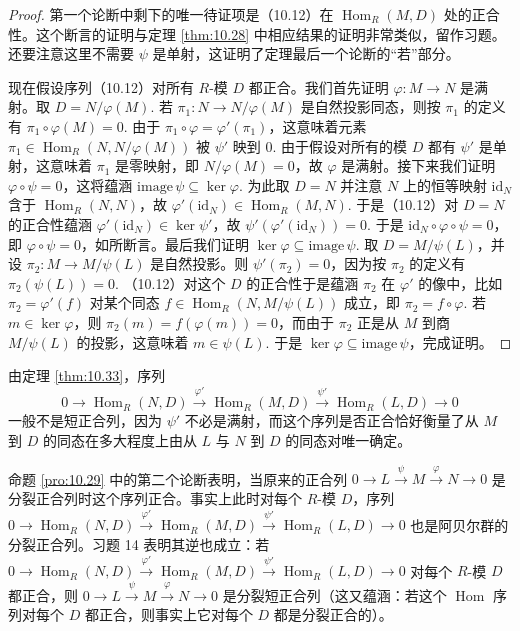 \begin{proof}
第一个论断中剩下的唯一待证项是（10.12）在 \(\operatorname{Hom}_R(M, D)\) 处的正合性。这个断言的证明与定理 \ref{thm:10.28} 中相应结果的证明非常类似，留作习题。还要注意这里不需要 \(\psi\) 是单射，这证明了定理最后一个论断的“若”部分。

现在假设序列（10.12）对所有 \(R\)-模 \(D\) 都正合。我们首先证明 \(\varphi : M \to N\) 是满射。取 \(D = N/\varphi(M)\). 若 \(\pi_1 : N \to N/\varphi(M)\) 是自然投影同态，则按 \(\pi_1\) 的定义有 \(\pi_1 \circ \varphi(M) = 0\). 由于 \(\pi_1 \circ \varphi = \varphi'(\pi_1)\)，这意味着元素 \(\pi_1 \in \operatorname{Hom}_R(N, N/\varphi(M))\) 被 \(\psi'\) 映到 0. 由于假设对所有的模 \(D\) 都有 \(\psi'\) 是单射，这意味着 \(\pi_1\) 是零映射，即 \(N/\varphi(M) = 0\)，故 \(\varphi\) 是满射。接下来我们证明 \(\varphi \circ \psi = 0\)，这将蕴涵 \(\mathrm{image}\,\psi \subseteq \ker\varphi\). 为此取 \(D = N\) 并注意 \(N\) 上的恒等映射 \(\mathrm{id}_N\) 含于 \(\operatorname{Hom}_R(N, N)\)，故 \(\varphi'(\mathrm{id}_N) \in \operatorname{Hom}_R(M, N)\). 于是（10.12）对 \(D = N\) 的正合性蕴涵 \(\varphi'(\mathrm{id}_N) \in \ker\psi'\)，故 \(\psi'(\varphi'(\mathrm{id}_N)) = 0\). 于是 \(\mathrm{id}_N \circ \varphi \circ \psi = 0\)，即 \(\varphi \circ \psi = 0\)，如所断言。最后我们证明 \(\ker\varphi \subseteq \mathrm{image}\,\psi\). 取 \(D = M/\psi(L)\)，并设 \(\pi_2 : M \to M/\psi(L)\) 是自然投影。则 \(\psi'(\pi_2) = 0\)，因为按 \(\pi_2\) 的定义有 \(\pi_2(\psi(L)) = 0\). （10.12）对这个 \(D\) 的正合性于是蕴涵 \(\pi_2\) 在 \(\varphi'\) 的像中，比如 \(\pi_2 = \varphi'(f)\) 对某个同态 \(f \in \operatorname{Hom}_R(N, M/\psi(L))\) 成立，即 \(\pi_2 = f \circ \varphi\). 若 \(m \in \ker\varphi\)，则 \(\pi_2(m) = f(\varphi(m)) = 0\)，而由于 \(\pi_2\) 正是从 \(M\) 到商 \(M/\psi(L)\) 的投影，这意味着 \(m \in \psi(L)\). 于是 \(\ker\varphi \subseteq \mathrm{image}\,\psi\)，完成证明。
\end{proof}

由定理 \ref{thm:10.33}，序列
\[
0 \longrightarrow \operatorname{Hom}_R(N, D) \xrightarrow{\ \varphi'\ } \operatorname{Hom}_R(M, D) \xrightarrow{\ \psi'\ } \operatorname{Hom}_R(L, D) \longrightarrow 0
\]
一般不是短正合列，因为 \(\psi'\) 不必是满射，而这个序列是否正合恰好衡量了从 \(M\) 到 \(D\) 的同态在多大程度上由从 \(L\) 与 \(N\) 到 \(D\) 的同态对唯一确定。

命题 \ref{pro:10.29} 中的第二个论断表明，当原来的正合列 \(0 \to L \xrightarrow{\psi} M \xrightarrow{\varphi} N \to 0\) 是分裂正合列时这个序列正合。事实上此时对每个 \(R\)-模 \(D\)，序列 \(0 \to \operatorname{Hom}_R(N, D) \xrightarrow{\varphi'} \operatorname{Hom}_R(M, D) \xrightarrow{\psi'} \operatorname{Hom}_R(L, D) \to 0\) 也是阿贝尔群的分裂正合列。习题 14 表明其逆也成立：若 \(0 \to \operatorname{Hom}_R(N, D) \xrightarrow{\varphi'} \operatorname{Hom}_R(M, D) \xrightarrow{\psi'} \operatorname{Hom}_R(L, D) \to 0\) 对每个 \(R\)-模 \(D\) 都正合，则 \(0 \to L \xrightarrow{\psi} M \xrightarrow{\varphi} N \to 0\) 是分裂短正合列（这又蕴涵：若这个 \(\operatorname{Hom}\) 序列对每个 \(D\) 都正合，则事实上它对每个 \(D\) 都是分裂正合的）。

